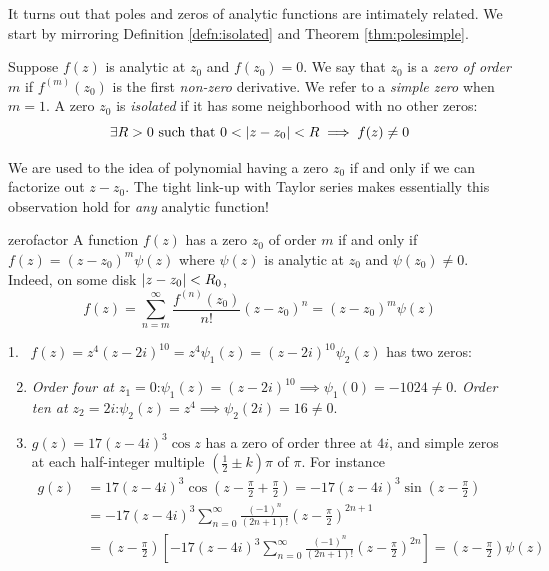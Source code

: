 
It turns out that poles and zeros of analytic functions are intimately related. We start by mirroring Definition \ref{defn:isolated} and Theorem \ref{thm:polesimple}.

\begin{defn}{}{}
Suppose $f(z)$ is analytic at $z_0$ and $f(z_0)=0$. We say that $z_0$ is a \emph{zero of order $m$} if $f^{(m)}(z_0)$ is the first \emph{non-zero} derivative. We refer to a \emph{simple zero} when $m=1$.\smallbreak
A zero $z_0$ is \emph{isolated} if it has some neighborhood with no other zeros:
\[\exists R>0\text{ such that }0<\left| z-z_0\right|<R\implies f(z)\neq 0\]
\end{defn}

We are used to the idea of polynomial having a zero $z_0$ if and only if we can factorize out $z-z_0$. The tight link-up with Taylor series makes essentially this observation hold for \emph{any} analytic function!


\begin{lemm}{}{zerofactor}
A function $f(z)$ has a zero $z_0$ of order $m$ if and only if $f(z)=(z-z_0)^m\psi(z)$ where $\psi(z)$ is analytic at $z_0$ and $\psi(z_0)\neq 0$. Indeed, on some disk $\left| z-z_0\right|<R_0$,
\[f(z)=\sum\limits_{n=m}^\infty\frac{f^{(n)}(z_0)}{n!}(z-z_0)^{n} =(z-z_0)^{m}\psi(z)\]
\end{lemm}
\goodbreak



\begin{examples}{}{}
\hangindent\leftmargini
\textup{1.} \ $f(z)=z^4(z-2i)^{10}=z^4\psi_1(z)=(z-2i)^{10}\psi_2(z)$ has two zeros:
\begin{enumerate}\setcounter{enumi}{1}
  \item[]\emph{Order four at $z_1=0$}:\quad $\psi_1(z)=(z-2i)^{10}\implies\psi_1(0)=-1024\neq 0$.\smallbreak
\emph{Order ten at $z_2=2i$}:\quad $\psi_2(z)=z^4\implies\psi_2(2i)=16\neq 0$.

	\item $g(z)=17(z-4i)^3\cos z$ has a zero of order three at $4i$, and simple zeros at each half-integer multiple $\left(\frac 12\pm k\right)\pi$ of $\pi$. For instance
	\begin{align*}
	g(z)&=17(z-4i)^3\cos\left(z-\frac\pi 2+\frac\pi 2\right)= -17(z-4i)^3\sin\left(z-\frac\pi 2\right)\\
	&=-17(z-4i)^3\sum_{n=0}^\infty\frac{(-1)^n}{(2n+1)!}\left(z-\frac\pi 2\right)^{2n+1}\\
	&=\left(z-\frac\pi 2\right)\left[-17(z-4i)^3\sum_{n=0}^\infty\frac{(-1)^n}{(2n+1)!}\left(z-\frac\pi 2\right)^{2n}\right] =\left(z-\frac\pi 2\right)\psi(z)
	\end{align*}
\end{enumerate}
\end{examples}



